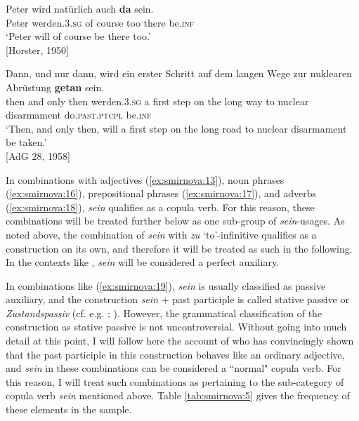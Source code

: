 \documentclass[output=paper,colorlinks,citecolor=brown]{langscibook}
\begin{document}
\ea\label{ex:smirnova:18}
\gll Peter wird natürlich auch \textbf{da} sein. \\
    Peter werden.\textsc{3.sg} {of course} too there be.\textsc{inf} \\
\glt `Peter will of course be there too.'\\
\hfill [Horster, 1950]
\z


\ea \label{ex:smirnova:19}
\gll Dann, und nur dann, wird ein erster Schritt auf dem langen Wege zur nuklearen Abrüstung \textbf{getan} sein. \\
    then and only then werden.\textsc{3.sg} a first step on the long way to nuclear disarmament do.\textsc{past.ptcpl} be.\textsc{inf} \\
\glt `Then, and only then, will a first step on the long road to nuclear disarmament be taken.'\\
\hfill [AdG 28, 1958]
\z

In combinations with adjectives (\ref{ex:smirnova:13}), noun phrases (\ref{ex:smirnova:16}), prepositional phrases (\ref{ex:smirnova:17}), and adverbs (\ref{ex:smirnova:18}), \emph{sein} qualifies as a copula verb. For this reason, these combinations will be treated further below as one sub-group of \emph{sein}-usages. As noted above, the combination of \emph{sein} with \emph{zu} `to'-infinitive qualifies as a construction on its own, and therefore it will be treated as such in the following. In the contexts like , \emph{sein} will be considered a perfect auxiliary.

In combinations like (\ref{ex:smirnova:19}), \emph{sein} is usually classified as passive auxiliary, and the construction \emph{sein} + past participle is called stative passive or \emph{Zustandspassiv} (cf. e.g. \cite{Helbig1983}; \cite[567--568]{DUDEN2016}). However, the grammatical classification of the construction as stative passive is not uncontroversial. Without going into much detail at this point, I will follow here the account of \citet{Maienborn2007} who has convincingly shown that the past participle in this construction behaves like an ordinary adjective, and \emph{sein} in these combinations can be considered a ``normal" copula verb. For this reason, I will treat such combinations as pertaining to the sub-category of copula verb \emph{sein} mentioned above. Table \ref{tab:smirnova:5} gives the frequency of these elements in the sample.
\end{document}
